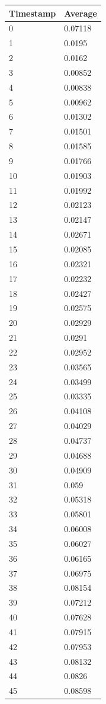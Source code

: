 %
%
\begin{tabular}{|l||l|}
\hline
	\textbf{Timestamp} & \textbf{Average} \\ \hline
	0 & 0.07118 \\ \hline
	1 & 0.0195 \\ \hline
	2 & 0.0162 \\ \hline
	3 & 0.00852 \\ \hline
	4 & 0.00838 \\ \hline
	5 & 0.00962 \\ \hline
	6 & 0.01302 \\ \hline
	7 & 0.01501 \\ \hline
	8 & 0.01585 \\ \hline
	9 & 0.01766 \\ \hline
	10 & 0.01903 \\ \hline
	11 & 0.01992 \\ \hline
	12 & 0.02123 \\ \hline
	13 & 0.02147 \\ \hline
	14 & 0.02671 \\ \hline
	15 & 0.02085 \\ \hline
	16 & 0.02321 \\ \hline
	17 & 0.02232 \\ \hline
	18 & 0.02427 \\ \hline
	19 & 0.02575 \\ \hline
	20 & 0.02929 \\ \hline
	21 & 0.0291 \\ \hline
	22 & 0.02952 \\ \hline
	23 & 0.03565 \\ \hline
	24 & 0.03499 \\ \hline
	25 & 0.03335 \\ \hline
	26 & 0.04108 \\ \hline
	27 & 0.04029 \\ \hline
	28 & 0.04737 \\ \hline
	29 & 0.04688 \\ \hline
	30 & 0.04909 \\ \hline
	31 & 0.059 \\ \hline
	32 & 0.05318 \\ \hline
	33 & 0.05801 \\ \hline
	34 & 0.06008 \\ \hline
	35 & 0.06027 \\ \hline
	36 & 0.06165 \\ \hline
	37 & 0.06975 \\ \hline
	38 & 0.08154 \\ \hline
	39 & 0.07212 \\ \hline
	40 & 0.07628 \\ \hline
	41 & 0.07915 \\ \hline
	42 & 0.07953 \\ \hline
	43 & 0.08132 \\ \hline
	44 & 0.0826 \\ \hline
	45 & 0.08598 \\ \hline
\end{tabular}
